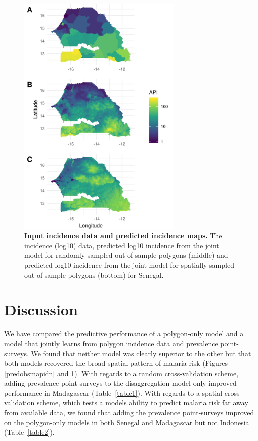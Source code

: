 \documentclass[10pt,letterpaper]{article}
\begin{document}
\begin{figure}
\includegraphics[width = 0.7\textwidth]{figures/sen_both_cv12_preds.png}
\caption{{\bf Input incidence data and predicted incidence maps. } 
The incidence (log10) data, predicted log10 incidence from the joint model for randomly sampled out-of-sample polygons (middle) and predicted log10 incidence from the joint model for spatially sampled out-of-sample polygons (bottom) for Senegal.
}
\label{predobsmapsen}
\end{figure}


\section*{Discussion}



We have compared the predictive performance of a polygon-only model and a model that jointly learns from polygon incidence data and prevalence point-surveys.
We found that neither model was clearly superior to the other but that both models recovered the broad spatial pattern of malaria risk (Figures \ref{predobsmapidn} and \ref{predobsmapsen}).
With regards to a random cross-validation scheme, adding prevalence point-surveys to the disaggregation model only improved performance in  Madagascar (Table~\ref{table1}).
With regards to a spatial cross-validation scheme, which tests a models ability to predict malaria risk far away from available data, we found that adding the prevalence point-surveys improved on the polygon-only models in both Senegal and Madagascar but not Indonesia (Table~\ref{table2}).
\end{document}
